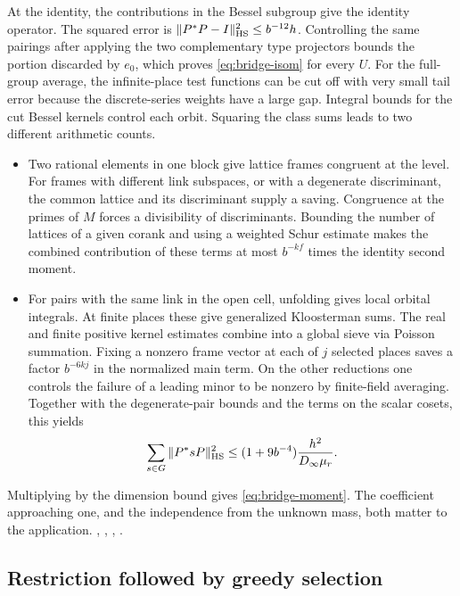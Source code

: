 At the identity, the contributions in the Bessel subgroup give the identity operator. The squared error is \(\|P^*P-I\|_{\rm HS}^2\le b^{-12}h\). Controlling the same pairings after applying the two complementary type projectors bounds the portion discarded by \(e_0\), which proves \eqref{eq:bridge-isom} for every \(U\). For the full-group average, the infinite-place test functions can be cut off with very small tail error because the discrete-series weights have a large gap. Integral bounds for the cut Bessel kernels control each orbit. Squaring the class sums leads to two different arithmetic counts.
\begin{itemize}
 \item Two rational elements in one block give lattice frames congruent at the level. For frames with different link subspaces, or with a degenerate discriminant, the common lattice and its discriminant supply a saving. Congruence at the primes of \(M\) forces a divisibility of discriminants. Bounding the number of lattices of a given corank and using a weighted Schur estimate makes the combined contribution of these terms at most \(b^{-kf}\) times the identity second moment.
 \item For pairs with the same link in the open cell, unfolding gives local orbital integrals. At finite places these give generalized Kloosterman sums. The real and finite positive kernel estimates combine into a global sieve via Poisson summation. Fixing a nonzero frame vector at each of \(j\) selected places saves a factor \(b^{-6kj}\) in the normalized main term. On the other reductions one controls the failure of a leading minor to be nonzero by finite-field averaging. Together with the degenerate-pair bounds and the terms on the scalar cosets, this yields
 \[
       \sum_{s\in G}\|P^*sP\|_{\rm HS}^2
          \le (1+9b^{-4})\frac{h^2}{D_\infty\mu_r}.
 \]
\end{itemize}
Multiplying by the dimension bound gives \eqref{eq:bridge-moment}. The coefficient approaching one, and the independence from the unknown mass, both matter to the application. , , , .

\subsection{Restriction followed by greedy selection}

